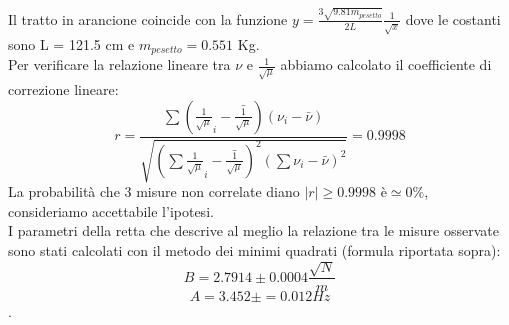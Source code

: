 \documentclass[a4paper]{article}
\theoremstyle{definition}
\begin{document}
\noindent Il tratto in arancione coincide con la funzione \(y = \frac{3\sqrt{9.81 m_{pesetto}}}{2 L}\frac{1}{\sqrt{x}}\) dove le costanti sono L = 121.5 cm e \(m_{pesetto} = 0.551\) Kg.\\
Per verificare la relazione lineare tra \(\nu\) e \(\frac{1}{\sqrt{\mu}}\) abbiamo calcolato il coefficiente di correzione lineare:
\[ r = \frac{\sum (\frac{1}{\sqrt{\mu}}_{i}-\bar{\frac{1}{\sqrt{\mu}}})(\nu_{i}-\bar{\nu})}{\sqrt{(\sum \frac{1}{\sqrt{\mu}}_{i}-\bar{\frac{1}{\sqrt{\mu}}})^{2}(\sum \nu_{i}-\bar{\nu})^{2}}} =  0.9998\]
\noindent La probabilità che 3 misure non correlate diano \(\left | r \right | \geq  0.9998\) è\(\simeq 0 \%\), consideriamo accettabile l'ipotesi.\\
I parametri della retta che descrive al meglio la relazione tra le misure osservate sono stati calcolati con il metodo dei minimi quadrati (formula riportata sopra):
\[B=2.7914\pm 0.0004 \frac{\sqrt{N}}{m}\]
\[A=3.452\pm =0.012Hz\] 
.\\
\begin{figure}[!htbp]
\end{figure}

\end{document}

